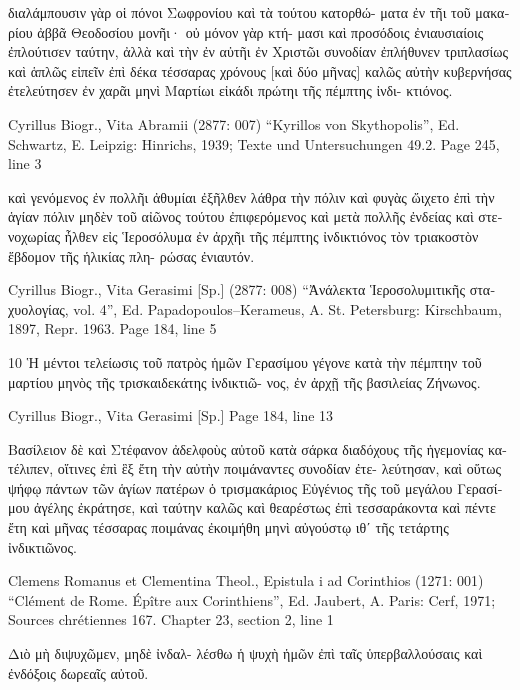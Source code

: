 \documentclass[12pt,letterpaper,twoside,final]{memoir}
\begin{document}
\begin{greek}
       διαλάμπουσιν γὰρ οἱ πόνοι Σωφρονίου καὶ τὰ τούτου κατορθώ-
ματα ἐν τῆι τοῦ μακαρίου ἀββᾶ Θεοδοσίου μονῆι· οὐ μόνον γὰρ κτή-
μασι καὶ προσόδοις ἐνιαυσιαίοις ἐπλούτισεν ταύτην, ἀλλὰ καὶ τὴν 
ἐν αὐτῆι ἐν Χριστῶι συνοδίαν ἐπλήθυνεν τριπλασίως καὶ ἁπλῶς εἰπεῖν   
ἐπὶ δέκα τέσσαρας χρόνους [καὶ δύο μῆνας] καλῶς αὐτὴν κυβερνήσας 
ἐτελεύτησεν ἐν χαρᾶι μηνὶ Μαρτίωι εἰκάδι πρώτηι τῆς πέμπτης ἰνδι-
κτιόνος. 



Cyrillus Biogr., Vita Abramii (2877: 007)
“Kyrillos von Skythopolis”, Ed. Schwartz, E.
Leipzig: Hinrichs, 1939; Texte und Untersuchungen 49.2.
Page 245, line 3

                                                           καὶ γενόμενος 
ἐν πολλῆι ἀθυμίαι ἐξῆλθεν λάθρα τὴν πόλιν καὶ φυγὰς ὤιχετο ἐπὶ   
τὴν ἁγίαν πόλιν μηδὲν τοῦ αἰῶνος τούτου ἐπιφερόμενος καὶ μετὰ 
πολλῆς ἐνδείας καὶ στενοχωρίας ἦλθεν εἰς Ἱεροσόλυμα ἐν ἀρχῆι 
τῆς πέμπτης ἰνδικτιόνος τὸν τριακοστὸν ἕβδομον τῆς ἡλικίας πλη-
ρώσας ἐνιαυτόν. 



Cyrillus Biogr., Vita Gerasimi [Sp.] (2877: 008)
“Ἀνάλεκτα Ἱεροσολυμιτικῆς σταχυολογίας, vol. 4”, Ed. Papadopoulos–Kerameus, A.
St. Petersburg: Kirschbaum, 1897, Repr. 1963.
Page 184, line 5

10 Ἡ μέντοι τελείωσις τοῦ πατρὸς ἡμῶν Γερασίμου γέγονε 
κατὰ τὴν πέμπτην τοῦ μαρτίου μηνὸς τῆς τρισκαιδεκάτης ἰνδικτιῶ-
νος, ἐν ἀρχῇ τῆς βασιλείας Ζήνωνος. 



Cyrillus Biogr., Vita Gerasimi [Sp.] 
Page 184, line 13

                                            Βασίλειον δὲ καὶ 
Στέφανον ἀδελφοὺς αὐτοῦ κατὰ σάρκα διαδόχους τῆς ἡγεμονίας κα-
τέλιπεν, οἵτινες ἐπὶ ἓξ ἔτη τὴν αὐτὴν ποιμάναντες συνοδίαν ἐτε-
λεύτησαν, καὶ οὕτως ψήφῳ πάντων τῶν ἁγίων πατέρων ὁ 
τρισμακάριος Εὐγένιος τῆς τοῦ μεγάλου Γερασίμου ἀγέλης ἐκράτησε, 
καὶ ταύτην καλῶς καὶ θεαρέστως ἐπὶ τεσσαράκοντα καὶ πέντε 
ἔτη καὶ μῆνας τέσσαρας ποιμάνας ἐκοιμήθη μηνὶ αὐγούστῳ ιθʹ 
τῆς τετάρτης ἰνδικτιῶνος. 




Clemens Romanus et Clementina Theol., Epistula i ad Corinthios (1271: 001)
“Clément de Rome. Épître aux Corinthiens”, Ed. Jaubert, A.
Paris: Cerf, 1971; Sources chrétiennes 167.
Chapter 23, section 2, line 1

   Διὸ μὴ διψυχῶμεν, μηδὲ ἰνδαλ-
λέσθω ἡ ψυχὴ ἡμῶν ἐπὶ ταῖς ὑπερβαλλούσαις καὶ ἐνδόξοις 
δωρεαῖς αὐτοῦ. 




\end{greek}
\end{document}
